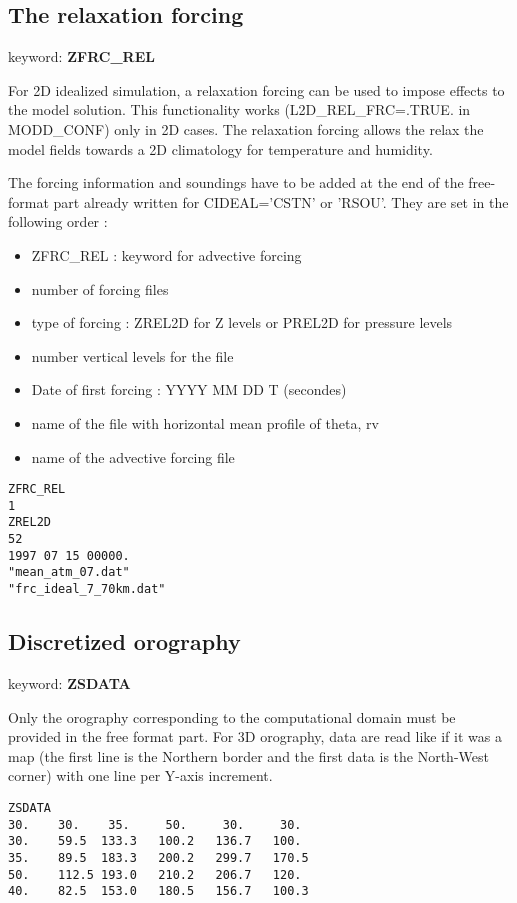 \subsection{The relaxation forcing} \label{ss:rel_forcing}

keyword: {\bf ZFRC\_REL} 

For 2D idealized simulation, a relaxation forcing can be used to impose effects to the model solution. This functionality works (L2D\_REL\_FRC=.TRUE. in MODD\_CONF) only in 2D cases.  The relaxation forcing allows the relax the model fields towards a 2D climatology for temperature and humidity.
         
The forcing information and soundings have to be added at the end of the
free-format part already written for CIDEAL='CSTN' or 'RSOU'. They are set in the following order : 
\begin{itemize}
\item ZFRC\_REL : keyword for advective forcing
\item number of forcing files
\item type of forcing : ZREL2D for Z levels or PREL2D for  pressure levels
\item number vertical levels for the file
\item Date of first forcing : YYYY MM DD T (secondes)
\item name of the file with horizontal mean profile of theta, rv
\item name of the advective forcing file
\end{itemize}

                                   
\begin{verbatim}
ZFRC_REL
1
ZREL2D
52
1997 07 15 00000.
"mean_atm_07.dat"
"frc_ideal_7_70km.dat"
\end{verbatim}

\subsection{Discretized orography}

keyword: {\bf ZSDATA}

Only the orography corresponding to the computational domain must be
provided in the free format part. For 3D orography, data are read like if it
was a map (the first line is the Northern border and the first data
is the North-West corner) with one line per Y-axis increment.

\begin{verbatim}
ZSDATA
30.    30.    35.     50.     30.     30.
30.    59.5  133.3   100.2   136.7   100.
35.    89.5  183.3   200.2   299.7   170.5
50.    112.5 193.0   210.2   206.7   120.
40.    82.5  153.0   180.5   156.7   100.3
\end{verbatim}

